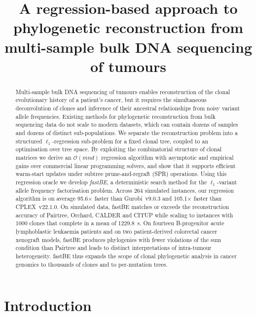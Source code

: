 \documentclass[11pt]{article}
\title{A regression-based approach to phylogenetic reconstruction from multi-sample bulk DNA sequencing of tumours}
\author{}
\date{}
\begin{document}
\maketitle

\begin{abstract}
Multi-sample bulk DNA sequencing of tumours enables reconstruction of the clonal evolutionary history of a patient's cancer, but it requires the simultaneous deconvolution of clones and inference of their ancestral relationships from noisy variant allele frequencies. Existing methods for phylogenetic reconstruction from bulk sequencing data do not scale to modern datasets, which can contain dozens of samples and dozens of distinct sub-populations. We separate the reconstruction problem into a structured $\ell_1$-regression sub-problem for a fixed clonal tree, coupled to an optimisation over tree space. By exploiting the combinatorial structure of clonal matrices we derive an $\mathcal{O}(mnd)$ regression algorithm with asymptotic and empirical gains over commercial linear programming solvers, and show that it supports efficient warm-start updates under subtree prune-and-regraft (SPR) operations. Using this regression oracle we develop \emph{fastBE}, a deterministic search method for the $\ell_1$-variant allele frequency factorisation problem. Across 264 simulated instances, our regression algorithm is on average 95.6$\times$ faster than Gurobi~v9.0.3 and 105.1$\times$ faster than CPLEX~v22.1.0. On simulated data, fastBE matches or exceeds the reconstruction accuracy of Pairtree, Orchard, CALDER and CITUP while scaling to instances with 1000 clones that complete in a mean of 1229.8~s. On fourteen B-progenitor acute lymphoblastic leukaemia patients and on two patient-derived colorectal cancer xenograft models, fastBE produces phylogenies with fewer violations of the sum condition than Pairtree and leads to distinct interpretations of intra-tumour heterogeneity. fastBE thus expands the scope of clonal phylogenetic analysis in cancer genomics to thousands of clones and to per-mutation trees.
\end{abstract}

\section{Introduction}
\end{document}
